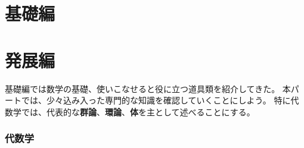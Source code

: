 \documentclass[a4j, 9pt]{ltjsarticle}
\begin{document}
\setcounter{tocdepth}{3} %
\tableofcontents
\clearpage

\part{基礎編}

  

  \newpage

  

  \newpage

  

  \newpage

  

  \newpage
  
  

  \newpage

  

  \newpage
  
\part{発展編}
  基礎編では数学の基礎、使いこなせると役に立つ道具類を紹介してきた。
  本パートでは、少々込み入った専門的な知識を確認していくことにしよう。
  特に代数学では、代表的な\textbf{群論}、\textbf{環論}、\textbf{体}を主として述べることにする。

  \section{代数学}
    
\end{document}
